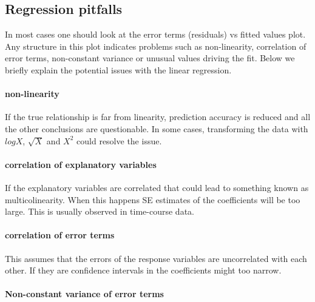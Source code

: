 \documentclass[12pt,]{krantz}
\let\oldparagraph\paragraph
\renewcommand{\paragraph}[1]{\oldparagraph{#1}\mbox{}}
\begin{document}
\hypertarget{regression-pitfalls}{%
\subsection{Regression pitfalls}\label{regression-pitfalls}}

In most cases one should look at the error terms (residuals) vs fitted
values plot. Any structure in this plot indicates problems such as
non-linearity, correlation of error terms, non-constant variance or
unusual values driving the fit. Below we briefly explain the potential
issues with the linear regression.

\hypertarget{non-linearity}{%
\paragraph{non-linearity}\label{non-linearity}}

If the true relationship is far from linearity, prediction accuracy
is reduced and all the other conclusions are questionable. In some cases,
transforming the data with \(logX\), \(\sqrt{X}\) and \(X^2\) could resolve
the issue.

\hypertarget{correlation-of-explanatory-variables}{%
\paragraph{correlation of explanatory variables}\label{correlation-of-explanatory-variables}}

If the explanatory variables are correlated that could lead to something
known as multicolinearity. When this happens SE estimates of the coefficients will be too large. This is usually observed in time-course
data.

\hypertarget{correlation-of-error-terms}{%
\paragraph{correlation of error terms}\label{correlation-of-error-terms}}

This assumes that the errors of the response variables are uncorrelated with each other. If they are confidence intervals in the coefficients
might too narrow.

\hypertarget{non-constant-variance-of-error-terms}{%
\paragraph{Non-constant variance of error terms}\label{non-constant-variance-of-error-terms}}
\end{document}
